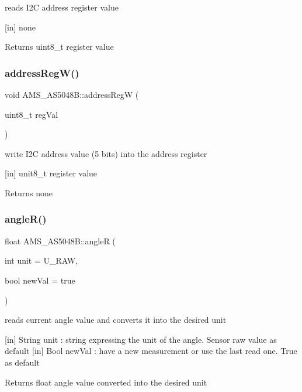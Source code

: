 reads I2C address register value 

\mbox{[}in\mbox{]} none \begin{DoxyReturn}{Returns}
uint8\+\_\+t register value 
\end{DoxyReturn}
\mbox{\label{classAMS__AS5048B_a8faebc24296fd8ac9464f5b5aab0d1d1}} 
\subsubsection{\texorpdfstring{address\+Reg\+W()}{addressRegW()}}
{\footnotesize\ttfamily void A\+M\+S\+\_\+\+A\+S5048\+B\+::address\+RegW (\begin{DoxyParamCaption}\item[{uint8\+\_\+t}]{reg\+Val }\end{DoxyParamCaption})}



write I2C address value (5 bits) into the address register 

\mbox{[}in\mbox{]} unit8\+\_\+t register value \begin{DoxyReturn}{Returns}
none 
\end{DoxyReturn}
\mbox{\label{classAMS__AS5048B_a91b6f6054e75ed1eb43faa16edd38ec5}} 
\subsubsection{\texorpdfstring{angle\+R()}{angleR()}}
{\footnotesize\ttfamily float A\+M\+S\+\_\+\+A\+S5048\+B\+::angleR (\begin{DoxyParamCaption}\item[{int}]{unit = {\ttfamily U\+\_\+RAW},  }\item[{bool}]{new\+Val = {\ttfamily true} }\end{DoxyParamCaption})}



reads current angle value and converts it into the desired unit 

\mbox{[}in\mbox{]} String unit \+: string expressing the unit of the angle. Sensor raw value as default \mbox{[}in\mbox{]} Bool new\+Val \+: have a new measurement or use the last read one. True as default \begin{DoxyReturn}{Returns}
float angle value converted into the desired unit 
\end{DoxyReturn}
\mbox{\label{classAMS__AS5048B_a9acf55772619d8df888be48c8a31eef8}} 
